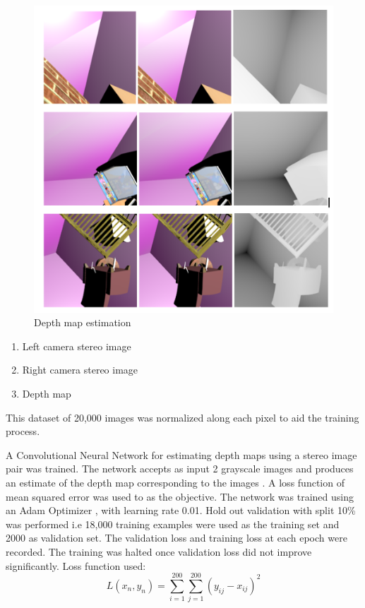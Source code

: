 \begin{figure}[!htb]
  \includegraphics[width=\linewidth]{images/depthmap1.png}
  \caption{Depth map estimation}
  \label{fig:boat1}
\end{figure}

\begin{enumerate}
\item Left camera stereo image
\item Right camera stereo image
\item Depth map
\end{enumerate}
This dataset of 20,000 images was normalized along each pixel to aid the training process.

A Convolutional Neural Network for estimating depth maps using a stereo image pair was trained. The network accepts as input 2 grayscale images and produces an estimate of the depth map corresponding to the images \cite{MayerIHFCDB15} \cite{foucard_2016}.
A loss function of mean squared error was used to as the objective. The network was trained using an Adam Optimizer \cite{KingmaB14}, with learning rate 0.01. Hold out validation with split 10\%  was performed i.e 18,000 training examples were used as the training set and 2000 as validation set. The validation loss and training loss at each epoch were recorded. The training was halted once validation loss did not improve significantly.
Loss function used:
\[ L(x_n,y_n) = {\sum_{i=1}^{200}\sum_{j=1}^{200}} (y_{ij} - x_{ij})^2 \]